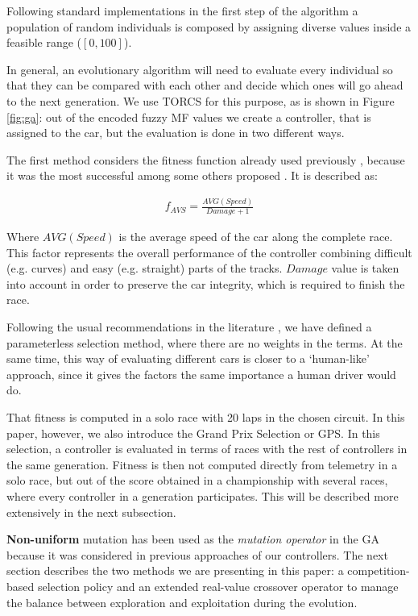 \documentclass[10pt,journal,compsoc]{IEEEtran}
\begin{document}
Following standard implementations in the first step of the algorithm \cite{salem_evo18} a
population of random individuals is composed by assigning diverse values inside a feasible range ($[0,100]$).

In general, an evolutionary algorithm will need to evaluate every
individual so that they can be compared with each other and decide
which ones will go ahead to the next generation. We use TORCS for this
purpose, as is shown in Figure \ref{fig:ga}: out of the encoded fuzzy
MF values we create a controller, that is assigned to the car, but the evaluation is done in two different ways.

The first method considers the fitness function already used
previously \cite{salem_cig2018}, because it was the most successful 
among some others proposed \cite{salem_evo18}. It is described as: 

 \begin{equation} \label{fit_avg}
 	\begin{array}{lll}
 		f_{AVS}= \frac{AVG(Speed)}{Damage+1}
 	\end{array}
 \end{equation}	

Where $AVG(Speed)$ is the average speed of the car along the complete
race. This factor represents the overall performance of the controller
combining difficult (e.g. curves) and easy (e.g. straight) parts of
the tracks. $Damage$ value is taken into account in order to preserve
the car integrity, which is required to finish the race. 

Following the usual recommendations in the literature
\cite{Harik-ParameterLess99}, we have defined a parameterless
selection method, where there are no weights in the terms.  At the
same time, this way of evaluating different cars is closer to a
`human-like' approach, since it gives the factors the same importance
a human driver would do.

That fitness is computed in a solo race with 20 laps in the chosen circuit. In this paper, however, we also introduce the Grand Prix Selection or GPS. In this
selection, a controller is evaluated in terms of races with the rest
of controllers in the same generation. Fitness is then not
computed directly from telemetry in a solo race, but out of the score
obtained in a championship with several races, where every controller
in a generation participates. This will be described more extensively
in the next subsection.

\textbf{Non-uniform} mutation \cite{mutation1997} has been used as the
\textit{mutation operator} in the GA because it was considered in
previous approaches of our controllers.
The next section describes the two methods we are presenting in this
paper: a competition-based selection policy and an extended real-value
crossover operator to manage the balance between exploration and
exploitation during the evolution.
\end{document}
